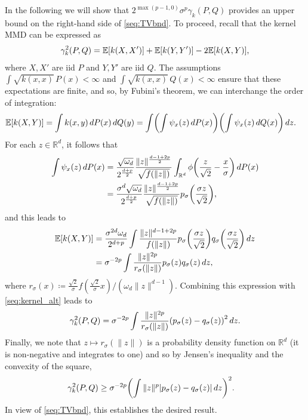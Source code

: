 \documentclass{article}
\theoremstyle{definition}
\newcommand{\reals}{\mathbb{R}}
\newcommand{\ex}[1]{\ensuremath{\mathbb{E}\left[ #1\right]}}
\let\originalleft\left
\let\originalright\right
\renewcommand{\left}{\mathopen{}\mathclose\bgroup\originalleft}
\renewcommand{\right}{\aftergroup\egroup\originalright}
\begin{document}
In the following we will show that $2^{\max(p-1,0)}\sigma^p \gamma_k(P,Q)$ 
provides an upper bound on the right-hand side of \eqref{seq:TVbnd}.  To proceed, recall that the kernel MMD can be expressed as
\begin{align}
\gamma^2_k(P,Q) = \ex{ k(X,X')}  + \ex{ k(Y,Y')} - 2 \ex{ k(X,Y)},  \label{seq:kernel_alt}
\end{align}
where $X,X'$ are iid $P$ and $Y,Y'$ are iid $Q$.  The assumptions  $\int \sqrt{k(x,x)} \, P(x) < \infty $ and $\int \sqrt{k(x,x)} \, Q(x) < \infty$  ensure that these expectations are finite, and so, by Fubini's theorem, we can interchange the order of integration:
\begin{align*}
\ex{ k(X,Y)} &=  \int k(x,y)\, d P(x) \, d Q(y)  = \int \left(\int \psi_x(z) \, d P(x) \right)  \left( \int \psi_x(z) \, d Q(x) \right)\, dz.
\end{align*}
For each $z \in \reals^d$, it follows that
\begin{align*}
     \int \psi_x(z) \, d P(x) & =  \frac{ \sqrt{\omega_d}}{ 2^\frac{d+p}{2}} \frac{ \|z\|^\frac{d-1  + 2p}{2}}{ \sqrt{ f(\|z\|)}}  \int_{\reals^d} \phi\left(\frac{ z}{\sqrt{2}}  - \frac{ x}{\sigma} \right ) \, dP(x) \\
& =  \frac{ \sigma^d \sqrt{\omega_d}}{ 2^\frac{d+p}{2}} \frac{ \|z\|^\frac{d-1  + 2p}{2}}{ \sqrt{ f(\|z\|)}}  p_{\sigma}\left( \frac{\sigma z}{\sqrt{2}} \right),
\end{align*}
and this leads to 
\begin{align*}
\ex{ k(X,Y)} & =  \frac{ \sigma^{2d} \omega_d}{ 2^{d+p} }   \int \frac{ \|z\|^{d -1  +2p}}{ f(\|z\|) }   p_{\sigma}\left( \frac{\sigma z}{\sqrt{2}} \right) q_{\sigma}\left( \frac{\sigma z}{\sqrt{2}} \right) \, dz \\
& =   \sigma^{-2p}    \int \frac{ \|z\|^{2p}}{ r_{\sigma}(\|z\|) }    p_\sigma(z) q_{\sigma}(z) \, dz ,
\end{align*}
where $r_{\sigma}(x) \coloneqq  \frac{ \sqrt{2}}{\sigma}  f( \frac{\sqrt{2}}{\sigma} x) / ( \omega_d \|z\|^{d-1} ) $.  Combining this expression with \eqref{seq:kernel_alt} leads to 
\begin{align*}
\gamma^2_k(P,Q) =   \sigma^{-2p} \int \frac{ \|z\|^{2p}}{ r_{\sigma}(\|z\|) }    \left( p_\sigma(z) -  q_{\sigma}(z) \right)^2 \, dz. 
\end{align*}
Finally,  we note that $z \mapsto r_{\sigma}(\|z\|)$ is a probability density function on $\reals^d$ (it is non-negative and integrates to one) and so by Jensen's inequality and the convexity of the square, 
\begin{align*}
\gamma^2_k(P,Q) & \ge   \sigma^{-2p}  \left(  \int  \|z\|^p    \left| p_\sigma(z) -  q_{\sigma}(z) \right| \, dz \right)^2 .
\end{align*}
In view of \eqref{seq:TVbnd}, this establishes the desired result. 
\end{document}
